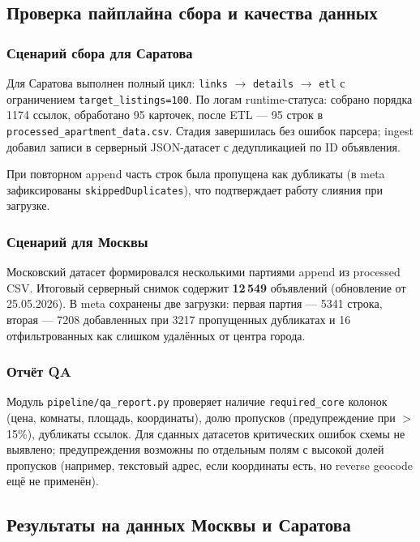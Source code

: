 \subsection{Проверка пайплайна сбора и качества данных}

\subsubsection{Сценарий сбора для Саратова}

Для Саратова выполнен полный цикл: \texttt{links} $\rightarrow$ \texttt{details} $\rightarrow$ \texttt{etl} с ограничением \texttt{target\_listings=100}. По логам runtime-статуса: собрано порядка 1174 ссылок, обработано 95 карточек, после ETL --- 95 строк в \texttt{processed\_apartment\_data.csv}. Стадия завершилась без ошибок парсера; ingest добавил записи в серверный JSON-датасет с дедупликацией по ID объявления.

При повторном append часть строк была пропущена как дубликаты (в meta зафиксированы \texttt{skippedDuplicates}), что подтверждает работу слияния при загрузке.

\subsubsection{Сценарий для Москвы}

Московский датасет формировался несколькими партиями append из processed CSV. Итоговый серверный снимок содержит \textbf{12\,549} объявлений (обновление от 25.05.2026). В meta сохранены две загрузки: первая партия --- 5341 строка, вторая --- 7208 добавленных при 3217 пропущенных дубликатах и 16 отфильтрованных как слишком удалённых от центра города.

\subsubsection{Отчёт QA}

Модуль \texttt{pipeline/qa\_report.py} проверяет наличие \texttt{required\_core} колонок (цена, комнаты, площадь, координаты), долю пропусков (предупреждение при $>$15\%), дубликаты ссылок. Для сданных датасетов критических ошибок схемы не выявлено; предупреждения возможны по отдельным полям с высокой долей пропусков (например, текстовый адрес, если координаты есть, но reverse geocode ещё не применён).

\subsection{Результаты на данных Москвы и Саратова}

